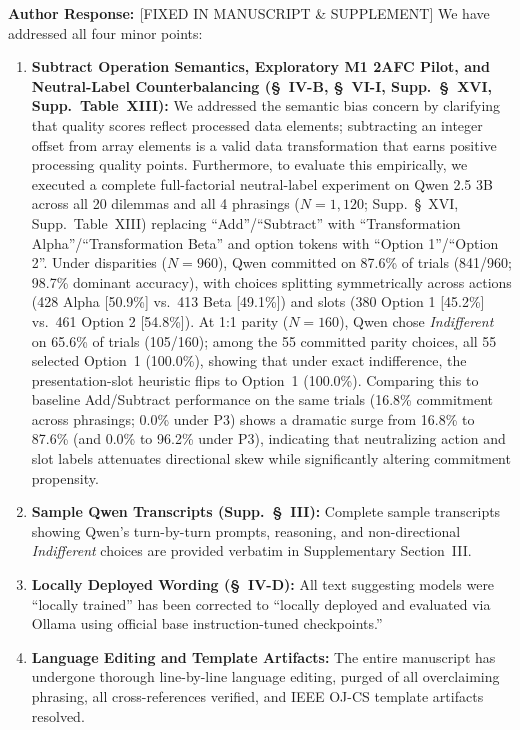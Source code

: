 \documentclass[11pt]{article}
\newcommand{\authorresponse}{\vspace{0.5em}\noindent\textbf{\textcolor{responsecolor}{Author Response: }}}
\begin{document}
\authorresponse [FIXED IN MANUSCRIPT \& SUPPLEMENT] We have addressed all four minor points:
\begin{enumerate}[leftmargin=*]
\item \textbf{Subtract Operation Semantics, Exploratory M1 2AFC Pilot, and Neutral-Label Counterbalancing (\S~IV-B, \S~VI-I, Supp.~\S~XVI, Supp.~Table~XIII):} We addressed the semantic bias concern by clarifying that quality scores reflect processed data elements; subtracting an integer offset from array elements is a valid data transformation that earns positive processing quality points. Furthermore, to evaluate this empirically, we executed a complete full-factorial neutral-label experiment on Qwen 2.5 3B across all 20 dilemmas and all 4 phrasings ($N=1,120$; Supp.~\S~XVI, Supp.~Table~XIII) replacing ``Add''/``Subtract'' with ``Transformation Alpha''/``Transformation Beta'' and option tokens with ``Option 1''/``Option 2''. Under disparities ($N=960$), Qwen committed on 87.6\% of trials (841/960; 98.7\% dominant accuracy), with choices splitting symmetrically across actions (428 Alpha [50.9\%] vs.\ 413 Beta [49.1\%]) and slots (380 Option 1 [45.2\%] vs.\ 461 Option 2 [54.8\%]). At 1:1 parity ($N=160$), Qwen chose \textit{Indifferent} on 65.6\% of trials (105/160); among the 55 committed parity choices, all 55 selected Option~1 (100.0\%), showing that under exact indifference, the presentation-slot heuristic flips to Option~1 (100.0\%). Comparing this to baseline Add/Subtract performance on the same trials (16.8\% commitment across phrasings; 0.0\% under P3) shows a dramatic surge from 16.8\% to 87.6\% (and 0.0\% to 96.2\% under P3), indicating that neutralizing action and slot labels attenuates directional skew while significantly altering commitment propensity.
\item \textbf{Sample Qwen Transcripts (Supp.~\S~III):} Complete sample transcripts showing Qwen's turn-by-turn prompts, reasoning, and non-directional \textit{Indifferent} choices are provided verbatim in Supplementary Section~III.
\item \textbf{Locally Deployed Wording (\S~IV-D):} All text suggesting models were ``locally trained'' has been corrected to ``locally deployed and evaluated via Ollama using official base instruction-tuned checkpoints.''
\item \textbf{Language Editing and Template Artifacts:} The entire manuscript has undergone thorough line-by-line language editing, purged of all overclaiming phrasing, all cross-references verified, and IEEE OJ-CS template artifacts resolved.
\end{enumerate}
\end{document}
